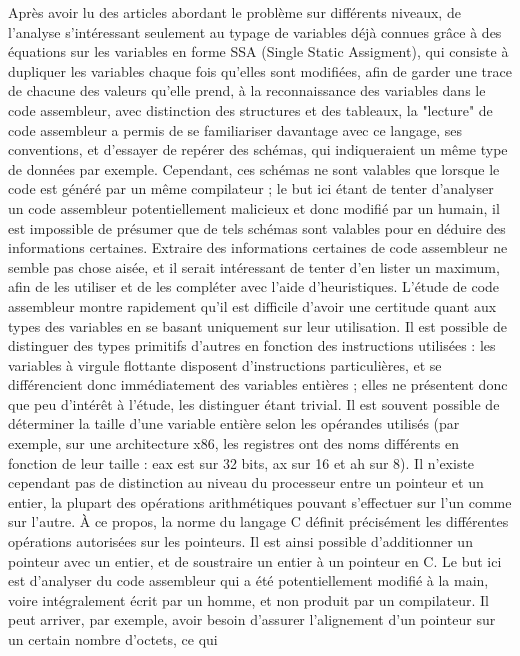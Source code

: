\documentclass[a4paper,12pt]{article}
\begin{document}
Après avoir lu des articles abordant le problème sur différents niveaux,
de l'analyse s'intéressant seulement au typage de variables déjà connues
grâce à des équations sur les variables en forme SSA (Single Static 
Assigment), qui consiste à dupliquer les variables chaque fois qu'elles
sont modifiées, afin de garder une trace de chacune des valeurs qu'elle
prend, à la reconnaissance des variables dans le code assembleur, avec
distinction des structures et des tableaux, la "lecture" de code assembleur
a permis de se familiariser davantage avec ce langage, ses conventions,
et d'essayer de repérer des schémas, qui indiqueraient un même type 
de données par exemple. Cependant, ces schémas ne sont valables que lorsque
le code est généré par un même compilateur ; le but ici étant de tenter
d'analyser un code assembleur potentiellement malicieux et donc modifié
par un humain, il est impossible de présumer que de tels schémas sont
valables pour en déduire des informations certaines. Extraire des
informations certaines de code assembleur ne semble pas chose aisée, et il
serait intéressant de tenter d'en lister un maximum, afin de les utiliser
et de les compléter avec l'aide d'heuristiques. L'étude de code assembleur
montre rapidement qu'il est difficile d'avoir une certitude quant aux types
des variables en se basant uniquement sur leur utilisation. Il est possible
de distinguer des types primitifs d'autres en fonction des instructions
utilisées : les variables à virgule flottante disposent d'instructions
particulières, et se différencient donc immédiatement des variables
entières ; elles ne présentent donc que peu d'intérêt à l'étude, les
distinguer étant trivial. Il est souvent possible de déterminer la taille
d'une variable entière selon les opérandes utilisés (par exemple, sur une
architecture x86, les registres ont des noms différents en fonction de leur
taille : eax est sur 32 bits, ax sur 16 et ah sur 8). Il n'existe cependant
pas de distinction au niveau du processeur entre un pointeur et un entier,
la plupart des opérations arithmétiques pouvant s'effectuer sur l'un comme
sur l'autre. À ce propos, la norme du langage C définit précisément les
différentes opérations autorisées sur les pointeurs. Il est ainsi possible
d'additionner un pointeur avec un entier, et de soustraire un entier à un
pointeur en C. Le but ici est d'analyser du code assembleur qui a été
potentiellement modifié à la main, voire intégralement écrit par un homme,
et non produit par un compilateur. Il peut arriver, par exemple, avoir besoin
d'assurer l'alignement d'un pointeur sur un certain nombre d'octets, ce qui
\end{document}
